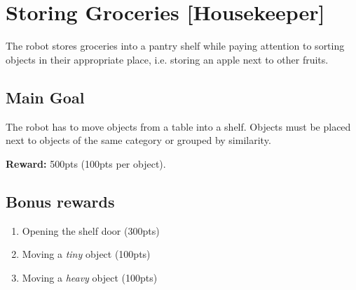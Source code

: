 \section{Storing Groceries [Housekeeper]}
The robot stores groceries into a pantry shelf while paying attention to sorting objects in their appropriate place, i.e. storing an apple next to other fruits.


\subsection{Main Goal}
The robot has to move objects from a table into a shelf. Objects must be placed next to objects of the same category or grouped by similarity.

\noindent\textbf{Reward:} 500pts (100pts per object).\\


\subsection{Bonus rewards}
\begin{enumerate}[nosep]
	\item Opening the shelf door (300pts)
	\item Moving a \emph{tiny} object (100pts)
	\item Moving a \emph{heavy} object (100pts)
\end{enumerate}

%
%
